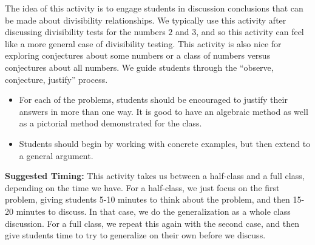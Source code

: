 \documentclass[nooutcomes]{ximera}
\begin{document}
\newpage
\begin{instructorNotes}
The idea of this activity is to engage students in discussion conclusions that can be made about divisibility relationships.  We typically use this activity after discussing divisibility tests for the numbers $2$ and $3$, and so this activity can feel like a more general case of divisibility testing.  This activity is also nice for exploring conjectures about some numbers or a class of numbers versus conjectures about all numbers.  We guide students through the ``observe, conjecture, justify'' process.

\begin{itemize}
    \item For each of the problems, students should be encouraged to justify their answers in more than one way.  It is good to have an algebraic method as well as a pictorial method demonstrated for the class.
    \item Students should begin by working with concrete examples, but then extend to a general argument.
\end{itemize}

{\bf Suggested Timing:} This activity takes us between a half-class and a full class, depending on the time we have.  For a half-class, we just focus on the first problem, giving students 5-10 minutes to think about the problem, and then 15-20 minutes to discuss.  In that case, we do the generalization as a whole class discussion.  For a full class, we repeat this again with the second case, and then give students time to try to generalize on their own before we discuss.

\end{instructorNotes}

 
\end{document}
